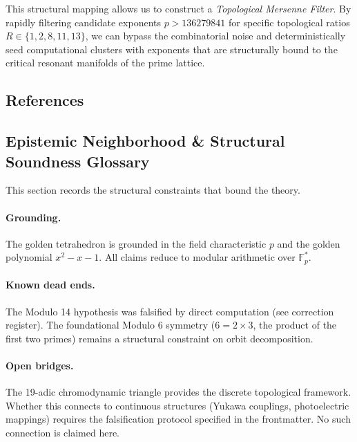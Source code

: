 This structural mapping allows us to construct a \emph{Topological Mersenne Filter}. By rapidly filtering candidate exponents $p > 136279841$ for specific topological ratios $R \in \{1, 2, 8, 11, 13\}$, we can bypass the combinatorial noise and deterministically seed computational clusters with exponents that are structurally bound to the critical resonant manifolds of the prime lattice.

\subsection*{References}


\subsection*{Epistemic Neighborhood \& Structural Soundness Glossary}

This section records the structural constraints that bound the theory.

\paragraph{Grounding.} The golden tetrahedron is grounded in the field characteristic $p$ and the golden polynomial $x^2 - x - 1$. All claims reduce to modular arithmetic over $\mathbb{F}_p^*$.

\paragraph{Known dead ends.} The Modulo 14 hypothesis was falsified by direct computation (see correction register). The foundational Modulo 6 symmetry ($6 = 2 \times 3$, the product of the first two primes) remains a structural constraint on orbit decomposition.

\paragraph{Open bridges.} The 19-adic chromodynamic triangle provides the discrete topological framework. Whether this connects to continuous structures (Yukawa couplings, photoelectric mappings) requires the falsification protocol specified in the frontmatter. No such connection is claimed here.



